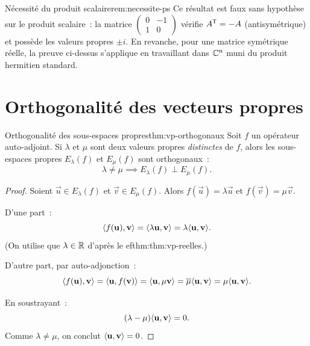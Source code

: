 \begin{remark}{Nécessité du produit scalaire}{rem:necessite-ps}
  Ce résultat est faux sans hypothèse sur le produit scalaire~: la matrice
  $\begin{pmatrix} 0 & -1 \\ 1 & 0 \end{pmatrix}$ vérifie
  ${A}^{\mathsf{T}} = -A$ (antisymétrique) et possède les valeurs propres
  $\pm i$. En revanche, pour une matrice symétrique réelle, la preuve
  ci-dessus s'applique en travaillant dans ${\mathbb{C}}^n$ muni du produit
  hermitien standard.
\end{remark}

\section{Orthogonalité des vecteurs propres}\label{sec:vp-orthogonaux}

\begin{theorem}{Orthogonalité des sous-espaces propres}{thm:vp-orthogonaux}
  Soit $f$ un opérateur auto-adjoint. Si $\lambda$ et $\mu$ sont deux
  valeurs propres \emph{distinctes}
  de $f$, alors les sous-espaces propres $E_\lambda(f)$ et $E_\mu(f)$
  sont orthogonaux~:
  \[
    \lambda \neq \mu \implies E_\lambda(f) \perp E_\mu(f).
  \]
\end{theorem}

\begin{proof}
  Soient $\vec{u} \in E_\lambda(f)$ et $\vec{v} \in E_\mu(f)$. Alors
  $f(\vec{u}) = \lambda \vec{u}$ et $f(\vec{v}) = \mu \vec{v}$.

  D'une part~:
  \[
    \langle f(\mathbf{u}), \mathbf{v}\rangle = \langle\lambda \mathbf{u}, \mathbf{v}\rangle
    = \lambda \langle\mathbf{u}, \mathbf{v}\rangle.
  \]
  (On utilise que $\lambda \in {\mathbb{R}}$ d'après le 
ef{thm:thm:vp-reelles}.)

  D'autre part, par auto-adjonction~:
  \[
    \langle f(\mathbf{u}), \mathbf{v}\rangle = \langle\mathbf{u}, f(\mathbf{v})\rangle
    = \langle\mathbf{u}, \mu \mathbf{v}\rangle
    = \overline{\mu} \langle\mathbf{u}, \mathbf{v}\rangle
    = \mu \langle\mathbf{u}, \mathbf{v}\rangle.
  \]

  En soustrayant~:
  \[
    (\lambda - \mu)\langle\mathbf{u}, \mathbf{v}\rangle = 0.
  \]
  Comme $\lambda \neq \mu$, on conclut $\langle\mathbf{u}, \mathbf{v}\rangle = 0$.
\end{proof}

